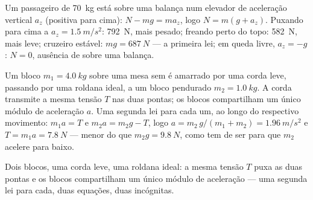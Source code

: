 \begin{example}[O elevador]\label{ex:g12:newtons-laws:elevator}
Um passageiro de \qty{70}{kg} está sobre uma balança num elevador de aceleração
vertical $a_z$ (positiva para cima): $N - mg = ma_z$, logo $N = m(g + a_z)$. Puxando
para cima a $a_z = \qty{1.5}{m/s^2}$: \qty{792}{N}, mais pesado; freando perto do
topo: \qty{582}{N}, mais leve; cruzeiro estável: $mg = \qty{687}{N}$ --- a primeira
lei; em queda livre, $a_z = -g$: $N = 0$, ausência de  sobre uma balança.
\end{example}

\begin{example}\label{ex:g12:newtons-laws:pulley}
Um bloco $m_1 = \qty{4.0}{kg}$ sobre uma mesa sem  é amarrado por uma corda
leve, passando por uma roldana ideal, a um bloco pendurado $m_2 = \qty{1.0}{kg}$. A
corda transmite a mesma tensão $T$ nas duas pontas; os blocos compartilham um único
módulo de aceleração $a$. Uma segunda lei para cada um, ao longo do respectivo
movimento: $m_1 a = T$ e $m_2 a = m_2 g - T$, logo
$a = m_2\,g/(m_1 + m_2) = \qty{1.96}{m/s^2}$ e $T = m_1 a = \qty{7.8}{N}$ --- menor
do que $m_2 g = \qty{9.8}{N}$, como tem de ser para que $m_2$ acelere para baixo.
\end{example}

\begin{omfigure}

{\small Dois blocos, uma corda leve, uma roldana ideal: a mesma tensão $T$ puxa as
duas pontas e os blocos compartilham um único módulo de aceleração --- uma segunda
lei para cada, duas equações, duas incógnitas.}
\end{omfigure}

